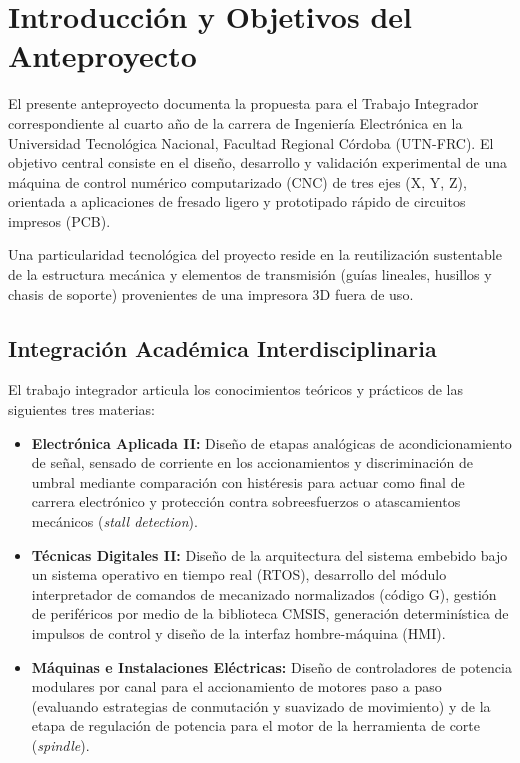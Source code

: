 \chapter{Introducción y Objetivos del Anteproyecto}
\label{sec:introduccion}

El presente anteproyecto documenta la propuesta para el Trabajo Integrador correspondiente al cuarto año de la
carrera de Ingeniería Electrónica en la Universidad Tecnológica Nacional, Facultad Regional Córdoba (UTN-FRC).
El objetivo central consiste en el diseño, desarrollo y validación experimental de una máquina de control numérico
computarizado (CNC) de tres ejes (X, Y, Z), orientada a aplicaciones de fresado ligero y prototipado rápido de
circuitos impresos (PCB).

Una particularidad tecnológica del proyecto reside en la reutilización sustentable de la estructura mecánica y
elementos de transmisión (guías lineales, husillos y chasis de soporte) provenientes de una impresora 3D fuera de uso.

\section{Integración Académica Interdisciplinaria}
\label{sec:integracion}

El trabajo integrador articula los conocimientos teóricos y prácticos de las siguientes tres materias:

\begin{itemize}
  \item \textbf{Electrónica Aplicada II:} Diseño de etapas analógicas de acondicionamiento de señal, sensado de
    corriente en los accionamientos y discriminación de umbral mediante comparación con histéresis para actuar como
    final de carrera electrónico y protección contra sobreesfuerzos o atascamientos mecánicos (\textit{stall detection}).
  \item \textbf{Técnicas Digitales II:} Diseño de la arquitectura del sistema embebido bajo un sistema operativo en
    tiempo real (RTOS), desarrollo del módulo interpretador de comandos de mecanizado normalizados (código G), gestión
    de periféricos por medio de la biblioteca CMSIS, generación determinística de impulsos de control y diseño de la
    interfaz hombre-máquina (HMI).
  \item \textbf{Máquinas e Instalaciones Eléctricas:} Diseño de controladores de potencia modulares por canal para el
    accionamiento de motores paso a paso (evaluando estrategias de conmutación y suavizado de movimiento) y de la etapa
    de regulación de potencia para el motor de la herramienta de corte (\textit{spindle}).
\end{itemize}

